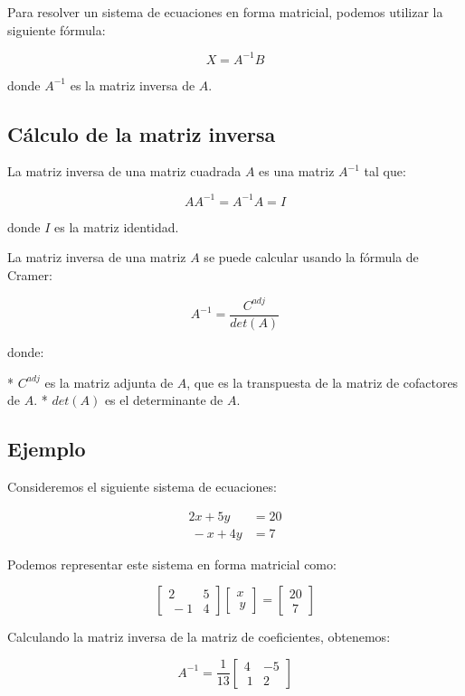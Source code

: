 \documentclass[12pt]{article}
\begin{document}
Para resolver un sistema de ecuaciones en forma matricial, podemos utilizar la siguiente fórmula:

$$X = A^{-1}B$$

donde $A^{-1}$ es la matriz inversa de $A$.

\subsection{Cálculo de la matriz inversa}

La matriz inversa de una matriz cuadrada $A$ es una matriz $A^{-1}$ tal que:

$$AA^{-1} = A^{-1}A = I$$

donde $I$ es la matriz identidad.

La matriz inversa de una matriz $A$ se puede calcular usando la fórmula de Cramer:

$$A^{-1} = \frac{C^{adj}}{det(A)}$$

donde:

* $C^{adj}$ es la matriz adjunta de $A$, que es la transpuesta de la matriz de cofactores de $A$.
* $det(A)$ es el determinante de $A$.

\subsection{Ejemplo}

Consideremos el siguiente sistema de ecuaciones:

$$\begin{align*}
2x + 5y &= 20 \\\
-x + 4y &= 7
\end{align*}$$

Podemos representar este sistema en forma matricial como:

$$\begin{bmatrix} 2 & 5 \\\ -1 & 4 \end{bmatrix} \begin{bmatrix} x \\\ y \end{bmatrix} = \begin{bmatrix} 20 \\\ 7 \end{bmatrix}$$

Calculando la matriz inversa de la matriz de coeficientes, obtenemos:

$$A^{-1} = \frac{1}{13}\begin{bmatrix} 4 & -5 \\\ 1 & 2 \end{bmatrix}$$
\end{document}
